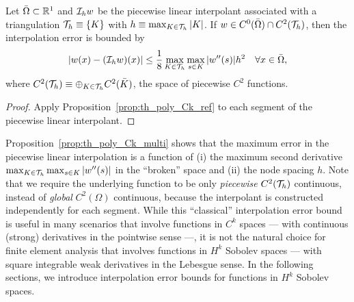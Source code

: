 \begin{proposition}
  \label{prop:th_poly_Ck_multi}
  Let $\bar \Omega \subset \mathbb{R}^1$ and $\mathcal{I}_h w$ be the piecewise linear interpolant associated with a triangulation $\mathcal{T}_h \equiv \{ K \}$ with $h \equiv \max_{K \in \mathcal{T}_h} |K|$.
  If $w \in C^0(\bar \Omega) \cap C^2(\mathcal{T}_h)$, then the interpolation error is bounded by
  \begin{equation*}
    | w(x) - (\mathcal{I}_h w)(x) | \leq \frac{1}{8} \max_{K \in \mathcal{T}_h} \max_{s \in K} |w''(s)| h^2 \quad \forall x \in \bar \Omega,
  \end{equation*}
  where $C^2(\mathcal{T}_h) \equiv \oplus_{K \in \mathcal{T}_h} C^2(\bar K)$, the space of piecewise $C^2$ functions.
  \begin{proof}
    Apply Proposition~\ref{prop:th_poly_Ck_ref} to each segment of the piecewise linear interpolant.
  \end{proof}
\end{proposition}
Proposition~\ref{prop:th_poly_Ck_multi} shows that the maximum error in the piecewise linear interpolation is a function of (i) the maximum second derivative $\max_{K \in \mathcal{T}_h} \max_{s \in K} |w''(s)|$ in the ``broken'' space and (ii) the node spacing $h$.  Note that we require the underlying function to be only \emph{piecewise} $C^2(\mathcal{T}_h)$ continuous, instead of \emph{global} $C^2(\Omega)$ continuous, because the interpolant is constructed independently for each segment.  While this ``classical'' interpolation error bound is useful in many scenarios that involve functions in $C^k$ spaces --- with continuous (strong) derivatives in the pointwise sense  ---, it is not the natural choice for finite element analysis that involves functions in $H^k$ Sobolev spaces --- with square integrable weak derivatives in the Lebesgue sense.  In the following sections, we introduce interpolation error bounds for functions in $H^k$ Sobolev spaces.

